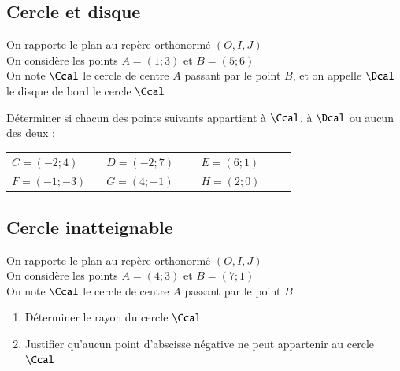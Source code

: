 \documentclass[oneside,12pt]{article}          %
\begin{document}
\subsection{Cercle et disque}
On rapporte le plan au repère orthonormé $(O,I,J)$\\
On considère les points $A=(1;3)$ et $B=(5;6)$ \\
On note $\Ccal$ le cercle de centre $A$ passant par le point $B$, et on appelle $\Dcal$ le disque de bord le cercle $\Ccal$

Déterminer si chacun des points suivants appartient à $\Ccal$, à $\Dcal$ ou aucun des deux :

\begin{tabular}{p{0.3\linewidth} p{0.3\linewidth} p{0.3\linewidth}}
	$C=(-2;4)$ & $D=(-2;7)$ & $E=(6;1)$ \\
	$F=(-1;-3)$ & $G=(4;-1)$ & $H=(2;0)$
\end{tabular}



\subsection{Cercle inatteignable}
On rapporte le plan au repère orthonormé $(O,I,J)$\\
On considère les points $A=(4;3)$ et $B=(7;1)$ \\
On note $\Ccal$ le cercle de centre $A$ passant par le point $B$
\begin{enumerate}
	\item Déterminer le rayon du cercle $\Ccal$
	\item Justifier qu'aucun point d'abscisse négative ne peut appartenir au cercle $\Ccal$
\end{enumerate}
\end{document}
